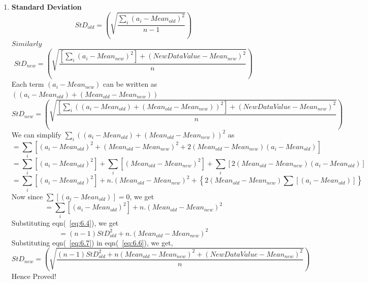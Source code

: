 \documentclass[12pt]{article}
\begin{document}
\begin{enumerate}
\item {\Large\textbf {Standard Deviation}} \newline
\begin{equation} \label{eq:6.4}
StD_{old} = \left(\sqrt{\frac{\sum_{i}(a_i-Mean_{old})^2}{n-1}}\right)
\end{equation}
$Similarly$
\begin{equation}\label{eq:6.5}
StD_{new} = \left(\sqrt{\frac{[\sum_{i}(a_i-Mean_{new})^2]+(NewDataValue-Mean_{new})^2}{n}}\right)
\end{equation}
Each term $(a_i - Mean_{new})$ can be written as $((a_i - Mean_{old}) + (Mean_{old} - Mean_{new}))$
\begin{equation}\label{eq:6.6}
StD_{new} = \left(\sqrt{\frac{[\sum_{i}((a_i - Mean_{old}) + (Mean_{old} - Mean_{new}))^2]+(NewDataValue-Mean_{new})^2}{n}}\right)
\end{equation}
We can simplify $\sum_i((a_i - Mean_{old}) + (Mean_{old} - Mean_{new}))^2$  as
\begin{equation*}
= \sum_i[(a_i - Mean_{old})^2 + (Mean_{old} - Mean_{new})^2 + 2(Mean_{old} - Mean_{new})(a_i - Mean_{old})]
\end{equation*}
\begin{equation*}
= \sum_i[(a_i - Mean_{old})^2] + \sum_i[(Mean_{old} - Mean_{new})^2] + \sum_i[2(Mean_{old} - Mean_{new})(a_i - Mean_{old})]
\end{equation*}
\begin{equation*}
= \sum_i[(a_i - Mean_{old})^2] + n.(Mean_{old} - Mean_{new})^2 + \left\{2(Mean_{old} - Mean_{new})\sum[(a_i - Mean_{old})]\right\}
\end{equation*}
Now since $\sum[(a_i - Mean_{old})] = 0$, we get
\begin{equation*}
= \sum_i[(a_i - Mean_{old})^2] + n.(Mean_{old} - Mean_{new})^2
\end{equation*}
Substituting eqn(~\ref{eq:6.4}), we get
\begin{equation}\label{eq:6.7}
= (n-1)StD_{old}^2 + n.(Mean_{old} - Mean_{new})^2
\end{equation}
Substituting eqn(~\ref{eq:6.7}) in eqn(~\ref{eq:6.6}), we get,
\begin{equation}\label{eq:6.8}
StD_{new} = \left(\sqrt{\frac{(n-1)StD_{old}^2+n(Mean_{old}-Mean_{new})^2+(NewDataValue-Mean_{new})^2}{n}}\right)
\end{equation}
Hence Proved!
\end{enumerate}
\end{document}
